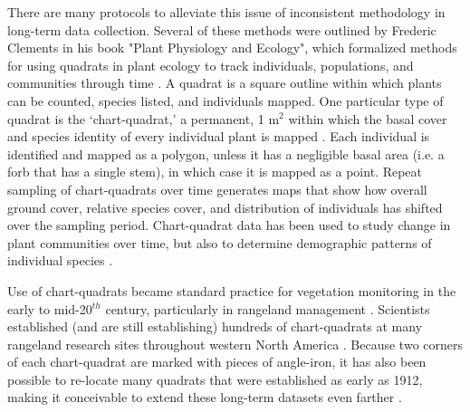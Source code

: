 \documentclass[12pt, letterpaper]{article}
\begin{document}
There are many protocols to alleviate this issue of inconsistent methodology in long-term data collection. Several of these methods were outlined by Frederic Clements in his book "Plant Physiology and Ecology", which formalized methods for using quadrats in plant ecology to track individuals, populations, and communities through time \cite{Clements1907}. A quadrat is a square outline within which plants can be counted, species listed, and individuals mapped. One particular type of quadrat is the ‘chart-quadrat,’ a permanent, 1 m$^2$ within which the basal cover and species identity of every individual plant is mapped \cite{Hill1920}. Each individual is identified and mapped as a polygon, unless it  has a negligible basal area (i.e. a forb that has a single stem), in which case it is mapped as a point. Repeat sampling of chart-quadrats over time generates maps that show how overall ground cover, relative species cover, and distribution of individuals has shifted over the sampling period. Chart-quadrat data has been used to study change in plant communities over time, but also to determine demographic patterns of individual species \cite{Albertson1965, Wright1976}.

Use of chart-quadrats became standard practice for vegetation monitoring in the early to mid-20$^{th}$ century, particularly in rangeland management \cite{Albertson1965, Hill1920}. Scientists established (and are still establishing) hundreds of chart-quadrats at many rangeland research sites throughout western North America \cite{Zachmann2010, Chu2013, Anderson2012, Anderson2011, Adler2007}. Because two corners of each chart-quadrat are marked with pieces of angle-iron, it has also been possible to re-locate many quadrats that were established as early as 1912, making it conceivable to extend these long-term datasets even farther \cite{Dowling2015, Adler2019}.
\end{document}
